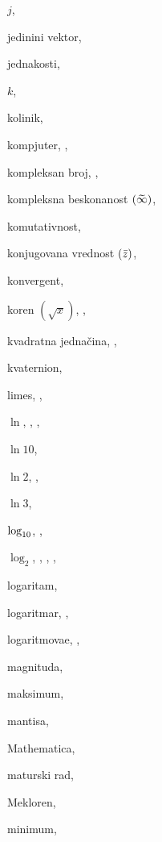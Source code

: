 \begin{theindex}
  \indexspace

  \item $j$, 
  \item jedini{\cv}ni vektor, 
  \item jednakosti, 

  \indexspace

  \item $k$, 
  \item koli{\cv}nik, 
  \item kompjuter, , 
  \item kompleksan broj, , 
  \item kompleksna beskona{\cv}nost $({\,\widetilde{\!\infty\!}\,})$, 
  \item komutativnost, 
  \item konjugovana vrednost $({\bar z})$, 
  \item konvergent, 
  \item koren $(\sqrt x)$, , 
  \item kvadratna jedna{{\v c}}ina, , 
  \item kvaternion, 

  \indexspace

  \item limes, , 
  \item $\ln$, , , 
  \item $\ln 10$, 
  \item $\ln 2$, , 
  \item $\ln3$, 
  \item $\log_{10}$, , 
  \item $\log_2$, , , , 
  \item logaritam, 
  \item logaritmar, , 
  \item logaritmova{\nj}e, , 

  \indexspace

  \item magnituda, 
  \item maksimum, 
  \item mantisa, 
  \item Mathematica, 
  \item maturski rad, 
  \item Mekloren, 
  \item minimum, 


\end{theindex}

